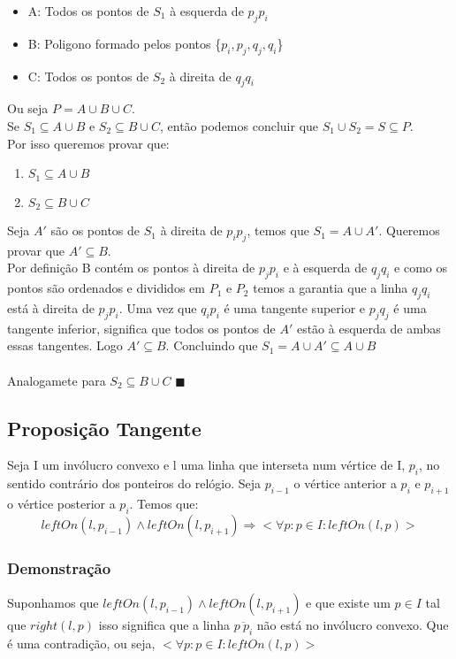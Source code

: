 \documentclass[11pt]{article}
\begin{document}
\begin{itemize}
    \item A: Todos os pontos de $S_1$ à esquerda de $p_jp_i$
    \item B: Poligono formado pelos pontos \{$p_i,p_j,q_j,q_i$\}
    \item C: Todos os pontos de $S_2$ à direita de $q_jq_i$
\end{itemize}
Ou seja $P = A \cup B \cup C$.\\
Se $S_1 \subseteq A \cup B$ e $S_2 \subseteq B \cup C$,
então podemos concluir que $S_1 \cup S_2 = S \subseteq P$.\\
Por isso queremos provar que:
\begin{enumerate}
    \item $S_1 \subseteq A \cup B$
    \item $S_2 \subseteq B \cup C$
\end{enumerate}
Seja $A'$ são os pontos de $S_1$ à direita de $p_ip_j$,
temos que $S_1 = A \cup A'$. 
\newline
Queremos provar que $A' \subseteq B$.\\
Por definição B contém os pontos à direita de $p_jp_i$ e à esquerda
de $q_jq_i$ e como os pontos são ordenados e divididos em $P_1$ e $P_2$
temos a garantia que a linha $q_jq_i$ está à direita de $p_jp_i$.
Uma vez que $q_ip_i$ é uma tangente superior e $p_jq_j$ é uma tangente
inferior, significa que todos os pontos de $A'$ estão à esquerda de
ambas essas tangentes. Logo $A' \subseteq B$.
Concluindo que $S_1 = A \cup A' \subseteq A \cup B$\\ \\
Analogamete para $S_2 \subseteq B \cup C$
\hfill $\blacksquare$

\subsection{Proposição Tangente}
Seja 
    I um invólucro convexo e 
    l uma linha que interseta num vértice de I, $p_i$,
no sentido contrário dos ponteiros do relógio.
Seja $p_{i-1}$ o vértice anterior a $p_i$ e $p_{i+1}$ o vértice posterior a $p_i$.
Temos que:
$$leftOn(l, p_{i-1}) \wedge leftOn(l, p_{i+1}) \Rightarrow
    <\forall p : p \in I : leftOn(l, p)>$$

\subsubsection{Demonstração}
Suponhamos que $leftOn(l, p_{i-1}) \wedge leftOn(l, p_{i+1})$ 
e que existe um $p \in I$ tal que $right(l, p)$
isso significa que a linha $\overline{p\ p_i}$ não está no invólucro convexo.
Que é uma contradição, ou seja, $<\forall p : p \in I : leftOn(l, p)>$
\end{document}

